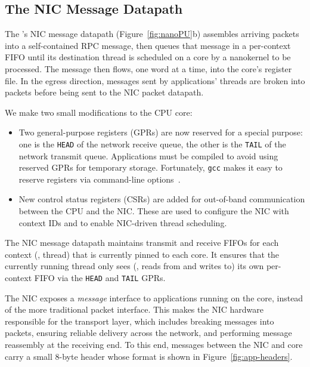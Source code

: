 \subsection{The NIC Message Datapath}
\label{ssec:niccore-interface}
The \name{}'s NIC message datapath (Figure~\ref{fig:nanoPU}b) assembles arriving packets into a self-contained RPC message, then queues that message in a per-context FIFO until its destination thread is scheduled on a core by a nanokernel to be processed.
The message then flows, one word at a time, into the core's register file.
In the egress direction, messages sent by applications' threads are broken into packets before being sent to the NIC packet datapath.

We make two small modifications to the CPU core:
\begin{itemize}[topsep=0.4\baselineskip, leftmargin=20pt]
    \item Two general-purpose registers (GPRs) are now reserved for a special purpose: one is the \verb|HEAD| of the network receive queue, the other is the \verb|TAIL| of the network transmit queue.
    Applications must be compiled to avoid using reserved GPRs for temporary storage.
    Fortunately, \verb|gcc| makes it easy to reserve registers via command-line options~\cite{gcc-options}.
    \item New control status registers (CSRs) are added for out-of-band communication between the CPU and the NIC.
    These are used to configure the NIC with context IDs and to enable NIC-driven thread scheduling.
\end{itemize}

The NIC message datapath maintains transmit and receive FIFOs for each context (\ie, thread) that is currently pinned to each core.
It ensures that the currently running thread only sees (\ie, reads from and writes to) its own per-context FIFO via the \verb|HEAD| and \verb|TAIL| GPRs.

The NIC exposes a {\em message} interface to applications running on the core, instead of the more traditional packet interface.
This makes the \name{} NIC hardware responsible for the transport layer, which includes breaking messages into packets, ensuring reliable delivery across the network, and performing message reassembly at the receiving end.
To this end, messages between the NIC and core carry a small 8-byte header whose format is shown in Figure~\ref{fig:app-headers}.

\begin{figure}
  \centering
  \small
  \begin{minipage}[c]{0.9\linewidth}
  
  \end{minipage}
  \vspace{-5pt}
  \label{lst:asm}
\end{figure}

